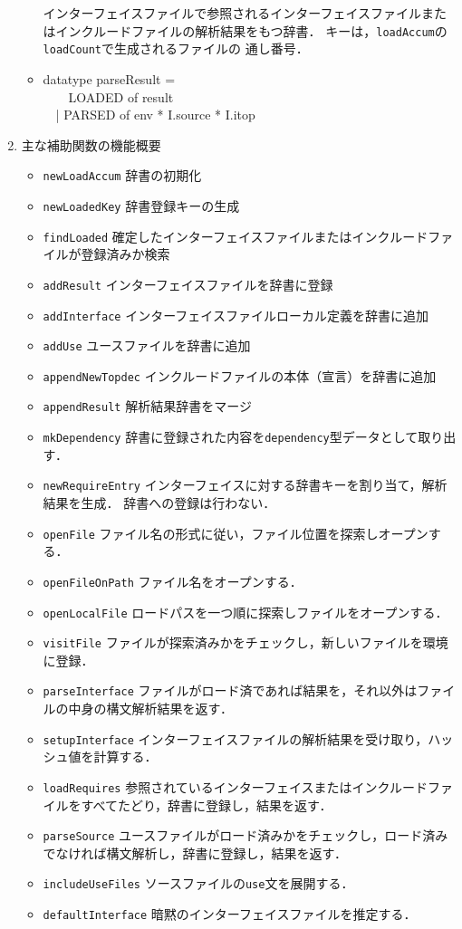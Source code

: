 \documentclass{jbook}
\newcommand{\code}[1]{\mbox{\large\tt #1}}
\newcommand{\myem}{\mbox{\ \ }}
\newenvironment{programPlain}{\begin{large}\begin{tt}}%
	                     {\end{tt}\end{large}}
\begin{document}
\begin{enumerate}
\begin{itemize}
	インターフェイスファイルで参照されるインターフェイスファイルまた
はインクルードファイルの解析結果をもつ辞書．
	キーは，\code{loadAccum}の\code{loadCount}で生成されるファイルの
通し番号．

\item 
\begin{programPlain}
datatype parseResult =\\
\myem\ \ LOADED of result\\
\myem  | PARSED of env * I.source * I.itop
\end{programPlain}
\end{itemize}

\item 主な補助関数の機能概要
\begin{itemize}
\item 
\code{newLoadAccum} 辞書の初期化
\item 
\code{newLoadedKey} 辞書登録キーの生成
\item 
\code{findLoaded} 確定したインターフェイスファイルまたはインクルードファイルが登録済みか検索
\item 
\code{addResult} インターフェイスファイルを辞書に登録
\item 
\code{addInterface} インターフェイスファイルローカル定義を辞書に追加
\item 
\code{addUse} ユースファイルを辞書に追加
\item 
\code{appendNewTopdec} インクルードファイルの本体（宣言）を辞書に追加
\item 
\code{appendResult} 解析結果辞書をマージ
\item 
\code{mkDependency} 辞書に登録された内容を\code{dependency}型データとして取り出す．
\item 
\code{newRequireEntry} インターフェイスに対する辞書キーを割り当て，解析
結果を生成．
	辞書への登録は行わない．
\item 
\code{openFile} ファイル名の形式に従い，ファイル位置を探索しオープンする．
\item 
\code{openFileOnPath} ファイル名をオープンする．
\item 
\code{openLocalFile} ロードパスを一つ順に探索しファイルをオープンする．
\item 
\code{visitFile} ファイルが探索済みかをチェックし，新しいファイルを環境に登録．
\item 
\code{parseInterface} ファイルがロード済であれば結果を，それ以外はファイルの中身の構文解析結果を返す．
\item 
\code{setupInterface} インターフェイスファイルの解析結果を受け取り，ハッシュ値を計算する．
\item 
\code{loadRequires} 参照されているインターフェイスまたはインクルードファ
イルをすべてたどり，辞書に登録し，結果を返す．
\item 
\code{parseSource} ユースファイルがロード済みかをチェックし，ロード済み
でなければ構文解析し，辞書に登録し，結果を返す．
\item 
\code{includeUseFiles} ソースファイルの\code{use}文を展開する．
\item 
\code{defaultInterface} 暗黙のインターフェイスファイルを推定する．
\end{itemize}
\end{enumerate}
\end{document}

